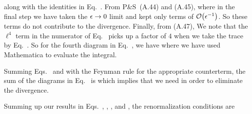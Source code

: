\documentclass[11pt]{article}
\begin{document}
{	
	along with the identities in Eq.~.  From P\&S~(A.44) and (A.45),
	where in the final step we have taken the $\epsilon \to 0$ limit and kept only terms of $\order{\eps^{-1}}$.  So these terms do not contribute to the divergence.  Finally, from (A.47),
	We note that the $\ell^4$ term in the numerator of Eq.~ picks up a factor of $4$ when we take the trace by Eq.~.  So for the fourth diagram in Eq.~, we have
	where we have used Mathematica to evaluate the integral.
	
	Summing Eqs.~ and  with the Feynman rule for the appropriate counterterm, the sum of the diagrams in Eq.~ is
	which implies that we need
	in order to eliminate the divergence.
	
	
	
	Summing up our results in Eqs.~, , , and , the renormalization conditions are
}


\makebib
\end{document}
